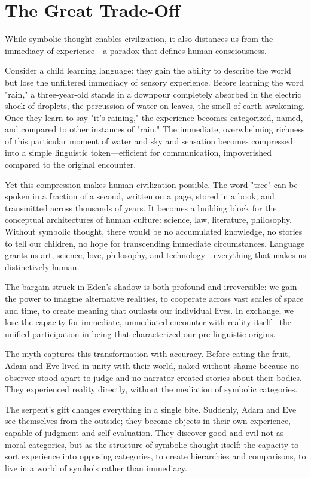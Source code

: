\section{The Great Trade-Off}

While symbolic thought enables civilization, it also distances us from the immediacy of experience—a paradox that defines human consciousness.

Consider a child learning language: they gain the ability to describe the world but lose the unfiltered immediacy of sensory experience. Before learning the word "rain," a three-year-old stands in a downpour completely absorbed in the electric shock of droplets, the percussion of water on leaves, the smell of earth awakening. Once they learn to say "it's raining," the experience becomes categorized, named, and compared to other instances of "rain." The immediate, overwhelming richness of this particular moment of water and sky and sensation becomes compressed into a simple linguistic token—efficient for communication, impoverished compared to the original encounter.

Yet this compression makes human civilization possible. The word "tree" can be spoken in a fraction of a second, written on a page, stored in a book, and transmitted across thousands of years. It becomes a building block for the conceptual architectures of human culture: science, law, literature, philosophy. Without symbolic thought, there would be no accumulated knowledge, no stories to tell our children, no hope for transcending immediate circumstances. Language grants us art, science, love, philosophy, and technology—everything that makes us distinctively human.

The bargain struck in Eden's shadow is both profound and irreversible: we gain the power to imagine alternative realities, to cooperate across vast scales of space and time, to create meaning that outlasts our individual lives. In exchange, we lose the capacity for immediate, unmediated encounter with reality itself—the unified participation in being that characterized our pre-linguistic origins.

The myth captures this transformation with accuracy. Before eating the fruit, Adam and Eve lived in unity with their world, naked without shame because no observer stood apart to judge and no narrator created stories about their bodies. They experienced reality directly, without the mediation of symbolic categories.

The serpent's gift changes everything in a single bite. Suddenly, Adam and Eve see themselves from the outside; they become objects in their own experience, capable of judgment and self-evaluation. They discover good and evil not as moral categories, but as the structure of symbolic thought itself: the capacity to sort experience into opposing categories, to create hierarchies and comparisons, to live in a world of symbols rather than immediacy.

